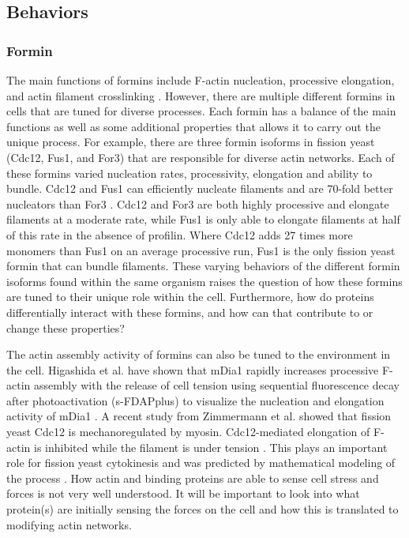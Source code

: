 \subsection{Behaviors}\label{ena-formin-behaviors}

\subsubsection{Formin}
The main functions of formins include F-actin nucleation, processive elongation, and actin filament crosslinking \citep{pollard_actin_2016}. However, there are multiple different formins in cells that are tuned for diverse processes. Each formin has a balance of the main functions as well as some additional properties that allows it to carry out the unique process. For example, there are three formin isoforms in fission yeast (Cdc12, Fus1, and For3) that are responsible for diverse actin networks. Each of these formins varied nucleation rates, processivity, elongation and ability to bundle. Cdc12 and Fus1 can efficiently nucleate filaments and are 70-fold better nucleators than For3 \citep{scott_functionally_2011}. Cdc12 and For3 are both highly processive and elongate filaments at a moderate rate, while Fus1 is only able to elongate filaments at half of this rate in the absence of profilin. Where Cdc12 adds 27 times more monomers than Fus1 on an average processive run, Fus1 is the only fission yeast formin that can bundle filaments. These varying behaviors of the different formin isoforms found within the same organism raises the question of how these formins are tuned to their unique role within the cell. Furthermore, how do proteins differentially interact with these formins, and how can that contribute to or change these properties?

The actin assembly activity of formins can also be tuned to the environment in the cell. Higashida et al. have shown that mDia1 rapidly increases processive F-actin assembly with the release of cell tension using sequential fluorescence decay after photoactivation (s-FDAPplus) to visualize the nucleation and elongation activity of mDia1 \citep{higashida_f-_2013}. A recent study from Zimmermann et al. showed that fission yeast Cdc12 is mechanoregulated by myosin. Cdc12-mediated elongation of F-actin is inhibited while the filament is under tension \citep{zimmermann_mechanoregulated_2017}. This plays an important role for fission yeast cytokinesis and was predicted by mathematical modeling of the process \citep{vavylonis_model_2006}. How actin and binding proteins are able to sense cell stress and forces is not very well understood. It will be important to look into what protein(s) are initially sensing the forces on the cell and how this is translated to modifying actin networks. 


